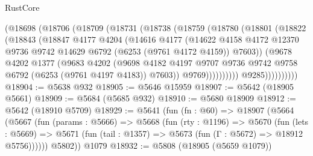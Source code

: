 \begin{lexlean}{RustCore}
\begin{coremodule}
                    (@18698
                      (@18706
                        (@18709
                          (@18731
                            (@18738
                              (@18759
                                (@18780
                                  (@18801
                                    (@18822
                                      (@18843
                                        (@18847
                                          @4177
                                          @4204
                                          (@14616
                                            @4177
                                            (@14622
                                              @4158
                                              @4172
                                              @12370
                                              @9736
                                              @9742
                                              @14629
                                              @6792
                                              (@6253 (@9761 @4172 @4159))
                                              @7603))
                                          (@9678
                                            @4202
                                            @1377
                                            (@9683
                                              @4202
                                              (@9698
                                                @4182
                                                @4197
                                                @9707
                                                @9736
                                                @9742
                                                @9758
                                                @6792
                                                (@6253 (@9761 @4197 @4183))
                                                @7603))
                                            @9769))))))))))
                        @9285))))))))))
@18904 := @5638 @932
@18905 := @5646 @15959
@18907 := @5642 (@18905 @5661)
@18909 := @5684 (@5685 @932)
@18910 := @5680 @18909
@18912 := @5642 (@18910 @5709)
@18929 := @5641
    (fun (fn : @60) =>
    @18907
      (@5664
        (@5667
          (fun (params : @5666) =>
          @5668
            (fun (rty : @1196) =>
            @5670
              (fun (lets : @5669) =>
              @5671 (fun (tail : @1357) => @5673 (fun (Γ : @5672) => @18912 @5756))))))
        @5802))
    @1079
@18932 := @5808 (@18905 (@5659 @1079))

\end{coremodule}
\end{lexlean}
